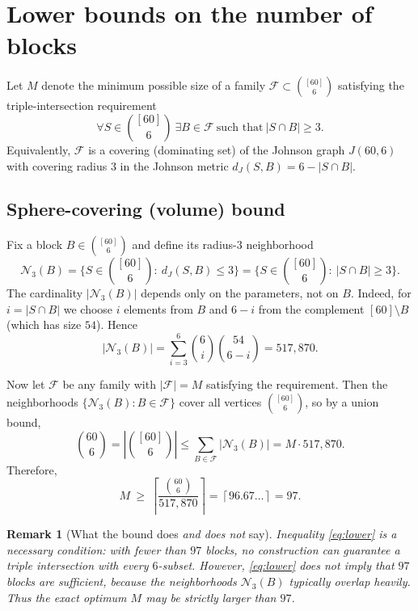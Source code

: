 \documentclass[11pt]{article}
\newtheorem{remark}{Remark}
\begin{document}
\section{Lower bounds on the number of blocks}\label{sec:lower}

Let $M$ denote the minimum possible size of a family $\mathcal{F}\subset\binom{[60]}{6}$
satisfying the triple-intersection requirement
\[
\forall S\in\binom{[60]}{6}\ \exists B\in\mathcal{F}\ \text{such that}\ |S\cap B|\ge 3.
\]
Equivalently, $\mathcal{F}$ is a covering (dominating set) of the Johnson graph $J(60,6)$
with covering radius $3$ in the Johnson metric $d_J(S,B)=6-|S\cap B|$.

\subsection*{Sphere-covering (volume) bound}

Fix a block $B\in\binom{[60]}{6}$ and define its radius-$3$ neighborhood
\[
\mathcal{N}_3(B)=\{S\in\binom{[60]}{6}:\ d_J(S,B)\le 3\}
              =\{S\in\binom{[60]}{6}:\ |S\cap B|\ge 3\}.
\]
The cardinality $|\mathcal{N}_3(B)|$ depends only on the parameters, not on $B$.
Indeed, for $i=|S\cap B|$ we choose $i$ elements from $B$ and $6-i$ from the complement
$[60]\setminus B$ (which has size $54$). Hence
\begin{equation}\label{eq:N}
|\mathcal{N}_3(B)|
=\sum_{i=3}^{6}\binom{6}{i}\binom{54}{6-i}
=517{,}870.
\end{equation}

Now let $\mathcal{F}$ be any family with $|\mathcal{F}|=M$ satisfying the requirement.
Then the neighborhoods $\{\mathcal{N}_3(B):B\in\mathcal{F}\}$ cover all vertices
$\binom{[60]}{6}$, so by a union bound,
\[
\binom{60}{6}
=\left|\binom{[60]}{6}\right|
\le \sum_{B\in\mathcal{F}}|\mathcal{N}_3(B)|
= M\cdot 517{,}870.
\]
Therefore,
\begin{equation}\label{eq:lower}
M\ \ge\ \left\lceil\frac{\binom{60}{6}}{517{,}870}\right\rceil
=\left\lceil 96.67\ldots\right\rceil
=97.
\end{equation}

\begin{remark}[What the bound does \emph{and does not} say]
Inequality \eqref{eq:lower} is a \emph{necessary} condition:
with fewer than $97$ blocks, no construction can guarantee a triple intersection
with every $6$-subset.
However, \eqref{eq:lower} does \emph{not} imply that $97$ blocks are sufficient,
because the neighborhoods $\mathcal{N}_3(B)$ typically overlap heavily.
Thus the exact optimum $M$ may be strictly larger than $97$.
\end{remark}
\end{document}
